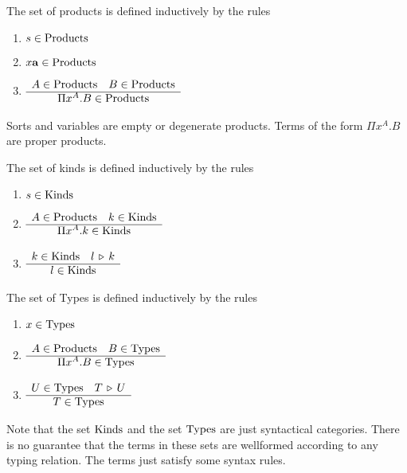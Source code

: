 \begin{definition}
  The set of products is defined inductively by the rules
  \begin{enumerate}

  \item $s \in \text{Products}$

  \item $x \mathbf{a} \in \text{Products}$

  \item
    $\begin{array}{c} A \in \text{Products} \quad B \in \text{Products} \\ \hline \Pi x^A.B \in \text{Products}\end{array}$
  \end{enumerate}
\end{definition}

Sorts and variables are empty or degenerate products. Terms of the form
$\Pi x^A.B$ are proper products.

\begin{definition}
  The set of kinds is defined inductively by the rules
  \begin{enumerate}

  \item $s \in \text{Kinds}$

  \item $\begin{array}{c}  A \in \text{Products} \quad k \in \text{Kinds} \\ \hline \Pi x^A.k \in \text{Kinds}\end{array}$

  \item $\begin{array}{c} k \in \text{Kinds} \quad l \,\triangleright\, k \\ \hline l \in \text{Kinds}\end{array}$
  \end{enumerate}

\end{definition}



\begin{definition}
  The set of Types is defined inductively by the rules
  \begin{enumerate}

  \item $x \in \text{Types}$

  \item $\begin{array}{c} A \in \text{Products} \quad B \in \text{Types} \\ \hline \Pi x^A.B \in \text{Types}\end{array}$

  \item $\begin{array}{c} U \in \text{Types} \quad T \,\triangleright\, U \\ \hline T \in \text{Types}\end{array}$
  \end{enumerate}

\end{definition}

Note that the set $\text{Kinds}$ and the set $\text{Types}$ are just syntactical
categories. There is no guarantee that the terms in these sets are wellformed
according to any typing relation. The terms just satisfy some syntax rules.


